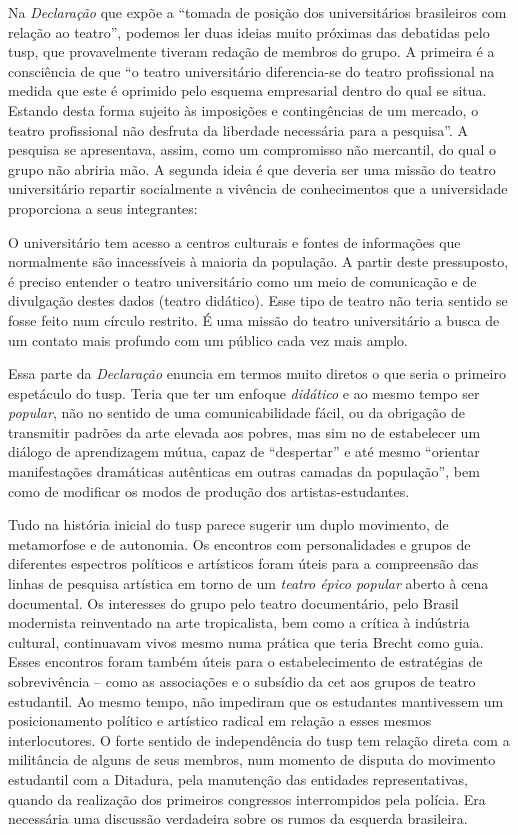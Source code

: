 Na {\it Declaração} que expõe a “tomada de posição dos universitários
brasileiros com relação ao teatro”, podemos ler duas ideias muito
próximas das debatidas pelo {\sc tusp}, que provavelmente tiveram redação de
membros do grupo. A primeira é a consciência de que “o teatro
universitário diferencia-se do teatro profissional na medida que este é
oprimido pelo esquema empresarial dentro do qual se situa. Estando desta
forma sujeito às imposições e contingências de um mercado, o teatro
profissional não desfruta da liberdade necessária para a pesquisa”. A
pesquisa se apresentava, assim, como um compromisso não mercantil, do qual
o grupo não abriria mão. A segunda ideia é que deveria ser uma missão do
teatro universitário repartir socialmente a vivência de conhecimentos
que a universidade proporciona a seus integrantes:

\startblockquote
O universitário tem acesso a centros culturais e fontes de informações
que normalmente são inacessíveis à maioria da população. A partir deste
pressuposto, é preciso entender o teatro universitário como um meio de
comunicação e de divulgação destes dados (teatro didático). Esse tipo de
teatro não teria sentido se fosse feito num círculo restrito. É uma
missão do teatro universitário a busca de um contato mais profundo com
um público cada vez mais amplo.
\stopblockquote

Essa parte da {\it Declaração} enuncia em termos muito diretos o que seria o
primeiro espetáculo do {\sc tusp}. Teria que ter um enfoque {\it didático} e
ao mesmo tempo ser {\it popular}, não no sentido de uma comunicabilidade
fácil, ou da obrigação de transmitir padrões da arte elevada aos pobres,
mas sim no de estabelecer um diálogo de aprendizagem mútua, capaz de
“despertar” e até mesmo “orientar manifestações dramáticas autênticas em
outras camadas da população”, bem como de modificar os modos de
produção dos artistas-estudantes.

Tudo na história inicial do {\sc tusp} parece sugerir um duplo movimento, de
metamorfose e de autonomia. Os encontros com personalidades e grupos de
diferentes espectros políticos e artísticos foram úteis para a
compreensão das linhas de pesquisa artística em torno de um {\it teatro
épico popular} aberto à cena documental. Os interesses do grupo pelo
teatro documentário, pelo Brasil modernista reinventado na arte
tropicalista, bem como a crítica à indústria cultural, continuavam vivos
mesmo numa prática que teria Brecht como guia. Esses encontros foram
também úteis para o estabelecimento de estratégias de sobrevivência --
como as associações e o subsídio da {\sc cet} aos grupos de teatro estudantil.
Ao mesmo tempo, não impediram que os estudantes mantivessem um
posicionamento político e artístico radical em relação a esses mesmos
interlocutores. O forte sentido de independência do {\sc tusp} tem relação
direta com a militância de alguns de seus membros, num momento de
disputa do movimento estudantil com a Ditadura, pela manutenção das
entidades representativas, quando da realização dos primeiros congressos
interrompidos pela polícia. Era necessária uma discussão verdadeira
sobre os rumos da esquerda brasileira.

